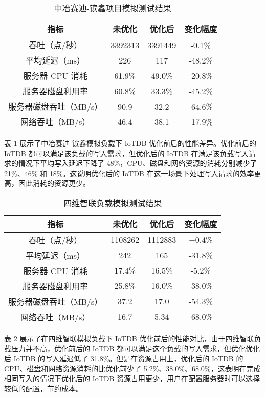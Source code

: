 \begin{table}
  \centering
  \caption{中冶赛迪-镔鑫项目模拟测试结果}
  \begin{tabular}{cccc}
    \toprule 
    指标 &  未优化  & 优化后 & 变化幅度 \\
    \midrule
    吞吐（点/秒） & 3392313 & 3391449 & -0.1\%\\
    平均延迟（ms） & 226 & 	117 & -48.2\%\\
    服务器 CPU 消耗 & 61.9\% & 	49.0\% & -20.8\%\\
    服务器磁盘利用率 & 60.8\% & 	33.3\% & -45.2\%\\
    服务器磁盘吞吐（MB/s） & 90.9 & 32.2 & -64.6\% \\
    网络吞吐（MB/s） & 46.4 & 38.1 & -17.9\%\\
    \bottomrule
  \end{tabular}
  \label{tabular:zysd-test-result}
\end{table}
表 \ref{tabular:zysd-test-result} 展示了中冶赛迪-镔鑫模拟负载下 IoTDB 优化前后的性能差异。优化前后的 IoTDB 都可以满足该负载的写入需求，但优化后的 IoTDB 在满足该负载写入请求的情况下平均写入延迟下降了 48\%，CPU、磁盘和网络资源的消耗分别减少了 21\%、46\% 和 18\%。这说明优化后的 IoTDB 在这一场景下处理写入请求的效率更高，因此消耗的资源更少。


\begin{table}
  \centering
  \caption{四维智联负载模拟测试结果}
  \begin{tabular}{cccc}
    \toprule 
    指标 &  未优化  & 优化后 & 变化幅度 \\
    \midrule  
    吞吐（点/秒） & 1108262 & 1112883 & +0.4\%\\  
    平均延迟（ms） & 242 & 165 & -31.8\%\\  
    服务器 CPU 消耗 & 17.4\% & 16.5\% & -5.2\%\\  
    服务器磁盘利用率 & 25.8\% & 16.0\% & -38.0\%\\  
    服务器磁盘吞吐（MB/s） & 37.2 & 17.0 & -54.3\% \\  
    网络吞吐（MB/s） & 16.7 & 5.34 & -68.0\%\\  
    \bottomrule 
  \end{tabular}
  \label{tabular:swzl-test-result}
\end{table}
表 \ref{tabular:swzl-test-result} 展示了在四维智联模拟负载下 IoTDB 优化前后的性能对比，由于四维智联负载压力并不高，优化前后的 IoTDB 都可以满足这个负载的写入需求，但优化优化后 IoTDB 的写入延迟低了 31.8\%。但是在资源占用上，优化后的 IoTDB 的 CPU、磁盘和网络资源消耗的比优化前少了 5.2\%、38.0\%、68.0\%，这表明在完成相同写入的情况下优化后的 IoTDB 资源占用更少，用户在配置服务器时可以选择较低的配置，节约成本。


